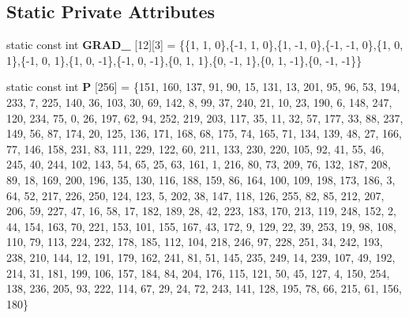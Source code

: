 \subsection*{Static Private Attributes}
\begin{DoxyCompactItemize}
\item 
\mbox{\label{classflounder_1_1noiseclassic_a0edf70f7d705f5ac98ca97f3e23dda3e}} 
static const int {\bfseries G\+R\+A\+D\+\_} \mbox{[}12\mbox{]}\mbox{[}3\mbox{]} = \{\{1, 1, 0\},\{-\/1, 1, 0\},\{1, -\/1, 0\},\{-\/1, -\/1, 0\},\{1, 0, 1\},\{-\/1, 0, 1\},\{1, 0, -\/1\},\{-\/1, 0, -\/1\},\{0, 1, 1\},\{0, -\/1, 1\},\{0, 1, -\/1\},\{0, -\/1, -\/1\}\}
\item 
\mbox{\label{classflounder_1_1noiseclassic_a2c171d55b4c399d70f610fd2d9897987}} 
static const int {\bfseries P} \mbox{[}256\mbox{]} = \{151, 160, 137, 91, 90, 15, 131, 13, 201, 95, 96, 53, 194, 233, 7, 225, 140, 36, 103, 30, 69, 142, 8, 99, 37, 240, 21, 10, 23, 190, 6, 148, 247, 120, 234, 75, 0, 26, 197, 62, 94, 252, 219, 203, 117, 35, 11, 32, 57, 177, 33, 88, 237, 149, 56, 87, 174, 20, 125, 136, 171, 168, 68, 175, 74, 165, 71, 134, 139, 48, 27, 166, 77, 146, 158, 231, 83, 111, 229, 122, 60, 211, 133, 230, 220, 105, 92, 41, 55, 46, 245, 40, 244, 102, 143, 54, 65, 25, 63, 161, 1, 216, 80, 73, 209, 76, 132, 187, 208, 89, 18, 169, 200, 196, 135, 130, 116, 188, 159, 86, 164, 100, 109, 198, 173, 186, 3, 64, 52, 217, 226, 250, 124, 123, 5, 202, 38, 147, 118, 126, 255, 82, 85, 212, 207, 206, 59, 227, 47, 16, 58, 17, 182, 189, 28, 42, 223, 183, 170, 213, 119, 248, 152, 2, 44, 154, 163, 70, 221, 153, 101, 155, 167, 43, 172, 9, 129, 22, 39, 253, 19, 98, 108, 110, 79, 113, 224, 232, 178, 185, 112, 104, 218, 246, 97, 228, 251, 34, 242, 193, 238, 210, 144, 12, 191, 179, 162, 241, 81, 51, 145, 235, 249, 14, 239, 107, 49, 192, 214, 31, 181, 199, 106, 157, 184, 84, 204, 176, 115, 121, 50, 45, 127, 4, 150, 254, 138, 236, 205, 93, 222, 114, 67, 29, 24, 72, 243, 141, 128, 195, 78, 66, 215, 61, 156, 180\}
\item 
\mbox{\label{classflounder_1_1noiseclassic_a796305eb36ef9dc61710bbfeddb0fd95}} 

\end{DoxyCompactItemize}
